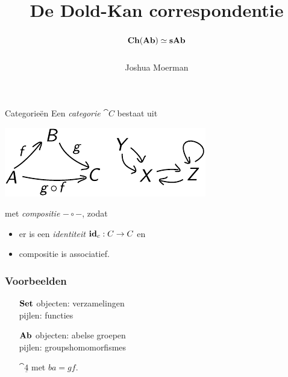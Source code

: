 \documentclass[14pt]{beamer}
\title{De Dold-Kan correspondentie
	\huge $$ \mathbf{Ch}(\mathbf{Ab}) \simeq \mathbf{sAb} $$}
\author{Joshua Moerman}
\institute[Radboud Universiteit Nijmegen]{Begeleid door Moritz Groth}
\date{}
\begin{document}
\begin{frame}
	\titlepage
\end{frame}

\begin{frame}{Categorie\"en}
	Een \emph{categorie} $\cat{C}$ bestaat uit
	
	\begin{center}
		\includegraphics{cat_th}
	\end{center}

	met \emph{compositie} $-\circ-$, zodat
	\begin{itemize}
		\item er is een \emph{identiteit} $\mathbf{id}_c: C \to C$ en
		\item compositie is associatief.
	\end{itemize}
\end{frame}

\begin{frame}
	\frametitle{Voorbeelden}
	\begin{itemize}
		\item[$\mathbf{Set}$]
			objecten: verzamelingen \\
			pijlen: functies
		\item[$\mathbf{Ab}$]
			objecten: abelse groepen \\
			pijlen: groupshomomorfismes
		\item[$\cat{\underline{4}}$] 
		 \hspace{1cm} met $ba = gf$.
	\end{itemize}
\end{frame}
\end{document}
